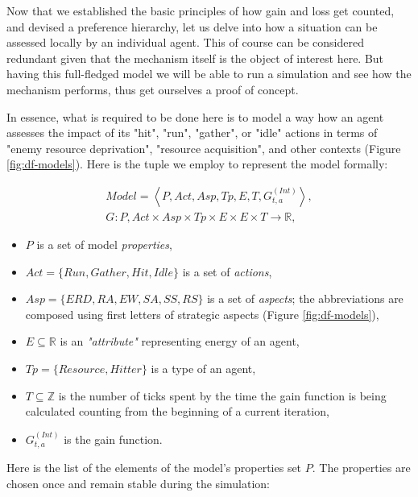 Now that we established the basic principles of how gain and loss get counted, and devised a preference hierarchy, let
us delve into how a situation can be assessed locally by an individual agent. This of course can be considered redundant
given that the mechanism itself is the object of interest here. But having this full-fledged
model we will be able to run a simulation and see how the mechanism performs, thus get ourselves a proof of concept.

In essence, what is required to be done here is to model a way how an agent assesses the impact of its "hit", "run",
"gather", or "idle" actions in terms of "enemy resource deprivation", "resource acquisition", and other contexts (Figure
\ref{fig:df-models}). Here is the tuple we employ to represent the model formally:

\begin{equation}
    \begin{gathered}
        Model = \left< P, Act, Asp, Tp, E, T, G_{t, a}^{(Int)} \right>,\\
        G: P, Act \times Asp \times Tp \times E \times E \times T \rightarrow \mathbb{R},
    \end{gathered}
\end{equation}

\begin{itemize}
    \item $P$ is a set of model \textit{properties},
    \item $Act = \{Run, Gather, Hit, Idle\}$ is a set of \textit{actions},
    \item $Asp = \{ ERD, RA, EW, SA, SS, RS \}$ is a set of \textit{aspects}; the abbreviations are composed using first letters of strategic aspects (Figure \ref{fig:df-models}),
    \item $E \subseteq \mathbb{R}$ is an \textit{"attribute"} representing energy of an agent,
    \item $Tp = \{Resource, Hitter \}$ is a type of an agent,
    \item $T \subseteq \mathbb{Z}$ is the number of ticks spent by the time the gain function is being calculated counting from the beginning of a current iteration,
    \item $G_{t, a}^{(Int)}$ is the gain function.
\end{itemize}

Here is the list of the elements of the model's properties set $P$. The properties are chosen once and remain stable
during the simulation:

